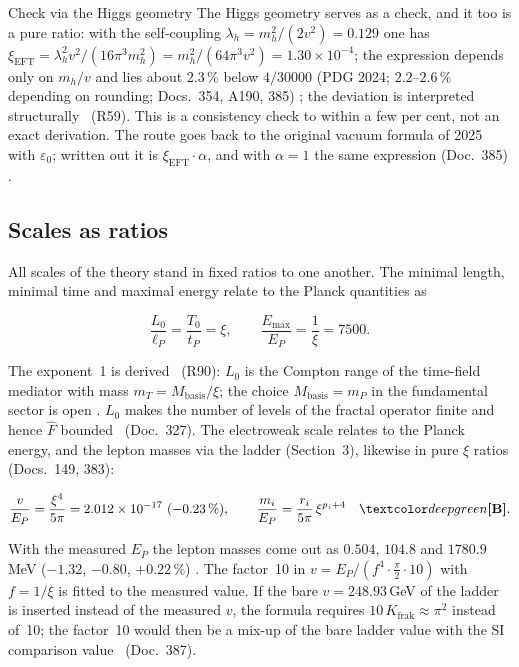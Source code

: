 \begin{ffkasten}{Check via the Higgs geometry}
The Higgs geometry serves as a check, and it too is a pure ratio: with the self-coupling
$\lambda_h=m_h^2/(2v^2)=0.129$ one has
$\xi_{\text{EFT}}=\lambda_h^2v^2/(16\pi^3m_h^2)=m_h^2/(64\pi^3v^2)=1.30\times10^{-4}$; the
expression depends only on $m_h/v$ and lies about $2.3\,\%$ below $4/30000$ (PDG 2024;
$2.2$--$2.6\,\%$ depending on rounding; Docs.~354, A190, 385) \KM; the deviation is interpreted
structurally \SM\ (R59). This is a consistency check to within a few per cent, not an exact
derivation. The route goes back to the original vacuum formula of 2025 with $\varepsilon_0$;
written out it is $\xi_{\text{EFT}}\cdot\alpha$, and with $\alpha=1$ the same expression
(Doc.~385) \BM.
\end{ffkasten}

\subsection{Scales as ratios}

All scales of the theory stand in fixed ratios to one another. The minimal length, minimal time
and maximal energy relate to the Planck quantities as
\begin{ffkern}
\begin{equation}
  \frac{L_0}{\ell_P}=\frac{T_0}{t_P}=\xi,\qquad \frac{E_{\max}}{E_P}=\frac1\xi=7500 .
\end{equation}
\end{ffkern}%
The exponent~1 is derived \BM\ (R90): $L_0$ is the Compton range of the time-field mediator with
mass $m_T=M_{\text{basis}}/\xi$; the choice $M_{\text{basis}}=m_P$ in the fundamental sector is
open \SM. $L_0$ makes the number of levels of the fractal operator finite and hence $\hat F$
bounded \BM\ (Doc.~327). The electroweak scale relates to the Planck energy, and the lepton masses
via the ladder (Section~3), likewise in pure $\xi$ ratios (Docs.~149, 383):
\begin{ffkern}
\begin{equation}
  \frac{v}{E_P}=\frac{\xi^4}{5\pi}=2.012\times10^{-17}\ (-0.23\,\%),\qquad
  \frac{m_i}{E_P}=\frac{r_i}{5\pi}\,\xi^{p_i+4}\quad\BM .
\end{equation}
\end{ffkern}%
With the measured $E_P$ the lepton masses come out as $0.504$, $104.8$ and $1780.9$\,MeV
($-1.32$, $-0.80$, $+0.22\,\%$) \KM. The factor~10 in
$v=E_P/(f^4\cdot\tfrac{\pi}{2}\cdot10)$ with $f=1/\xi$ is fitted to the measured value. If the bare
$v=248.93$\,GeV of the ladder is inserted instead of the measured $v$, the formula requires
$10\,K_{\text{frak}}\approx\pi^2$ instead of~10; the factor~10 would then be a mix-up of the bare
ladder value with the SI comparison value \SM\ (Doc.~387).

